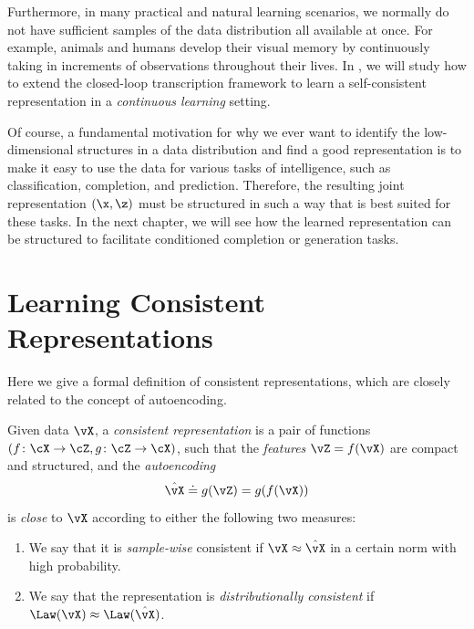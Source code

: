 \documentclass[../../book-main.tex]{subfiles}
\begin{document}
Furthermore, in many practical and natural learning scenarios, we normally do not have sufficient samples of the data distribution all available at once. For example, animals and humans develop their visual memory by continuously taking in increments of observations throughout their lives. In , we will study how to extend the closed-loop transcription framework to learn a self-consistent representation in a  {\em continuous learning} setting.

Of course, a fundamental motivation for why we ever want to identify the
low-dimensional structures in a data distribution and find a good
representation is to make it easy to use the data for various tasks
of intelligence, such as classification, completion, and prediction.
Therefore, the resulting joint representation $(\x, \z)$ must be
structured in such a way that is best suited for these tasks. In the
next chapter, we will
see how the learned representation can be structured to facilitate
conditioned completion or generation tasks.






\section{Learning Consistent Representations}\label{sec:consistent-representation}

Here we give a formal definition of consistent representations, which
are closely related to the concept of autoencoding. %
\begin{definition}\label{def:bidirectional_rep}
  Given data \(\vX\), a \textit{consistent representation} is a pair
  of functions \((f \colon \cX \to \cZ, g \colon \cZ \to \cX)\), such
  that the \textit{features} \(\vZ = f(\vX)\) are compact and
  structured, and the \textit{autoencoding} 
  \begin{equation}
    \hat{\vX} \doteq g(\vZ) = g(f(\vX))
  \end{equation}
  is \textit{close} to \(\vX\) according to either the
  following two measures:
  \begin{enumerate}
    \item We say that it is \textit{sample-wise} consistent if \(\vX
      \approx \hat{\vX}\) in a certain norm with high probability.
    \item We say that the representation is \textit{distributionally
      consistent} if \(\Law(\vX) \approx \Law(\hat{\vX})\).
  \end{enumerate}
\end{definition}
\end{document}
